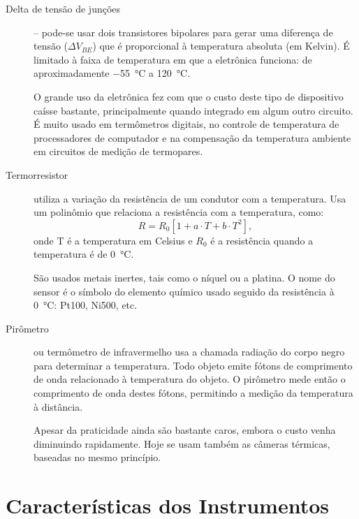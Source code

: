 \begin{description}
\item[Delta de tensão de junções] -- pode-se usar dois transistores bipolares para gerar uma diferença de tensão ($\Delta V_{BE}$) que é proporcional à temperatura absoluta (em Kelvin). É limitado à faixa de temperatura em que a eletrônica funciona: de aproximadamente \SI{-55}{\celsius} a \SI{120}{\celsius}.

O grande uso da eletrônica fez com que o custo deste tipo de dispositivo caísse bastante, principalmente quando integrado em algum outro circuito. É muito usado em termômetros digitais, no controle de temperatura de processadores de computador e na compensação da temperatura ambiente em circuitos de medição de termopares.

  \item[Termorresistor] utiliza a variação da resistência de um condutor com a temperatura. Usa um polinômio que relaciona a resistência com a temperatura, como:
  \[
R = R_0[1+a\cdot T+b\cdot T^2],
  \]
onde T é a temperatura em Celsius e $R_0$ é a resistência quando a temperatura é de \SI{0}{\celsius}.

São usados metais inertes, tais como o níquel ou a platina. O nome do sensor é o símbolo do elemento químico usado seguido da resistência à \SI{0}{\celsius}: Pt100, Ni500, etc.

  \item[Pirômetro] ou termômetro de infravermelho usa a chamada radiação do corpo negro para determinar a temperatura. Todo objeto emite fótons de comprimento de onda relacionado à temperatura do objeto. O pirômetro mede então o comprimento de onda destes fótons, permitindo a medição da temperatura à distância.

  Apesar da praticidade ainda são bastante caros, embora o custo venha diminuindo rapidamente. Hoje se usam também as câmeras térmicas, baseadas no mesmo princípio.
\end{description}

\section{Características dos Instrumentos}
\label{sec:Características dos Instrumentos}

